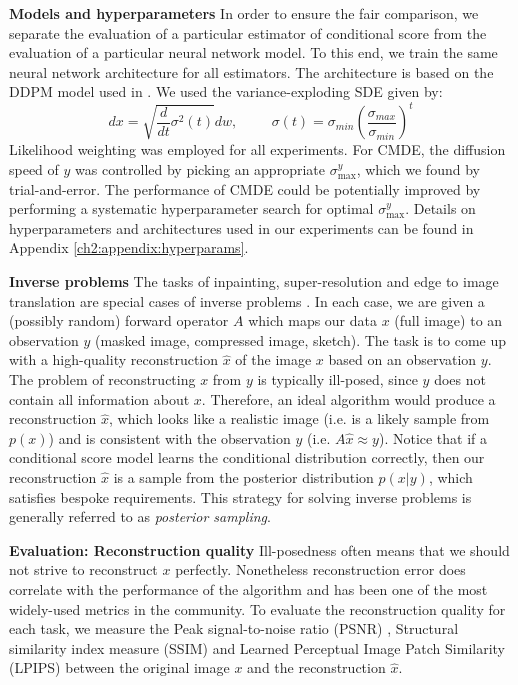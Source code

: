 \noindent
\textbf{Models and hyperparameters} In order to ensure the fair comparison, we separate the evaluation of a particular estimator of conditional score from the evaluation of a particular neural network model. To this end, we train the same neural network architecture for all estimators. The architecture is based on the DDPM model used in \cite{ho2020denoising, song2021sde}. 
We used the variance-exploding SDE \cite{song2021sde} given by: 
$$dx = \sqrt{\frac{d}{dt}\sigma^2(t)}dw, \hspace{1cm}
\sigma(t) = \sigma_{min} \left(\frac{\sigma_{max}}{\sigma_{min}}\right)^t$$
Likelihood weighting was employed for all experiments. For CMDE, the diffusion speed of $y$ was controlled by picking an appropriate $\sigma^y_{\max}$, which we found by trial-and-error. The performance of CMDE could be potentially improved by performing a systematic hyperparameter search for optimal $\sigma^y_{\max}$.
Details on hyperparameters and architectures used in our experiments can be found in Appendix \ref{ch2:appendix:hyperparams}.

\noindent 
\textbf{Inverse problems} The tasks of inpainting, super-resolution and edge to image translation are special cases of inverse problems \cite{arridge2019ip, muller2012ip}. In each case, we are given a (possibly random) forward operator $A$ which maps our data $x$ (full image) to an observation $y$ (masked image, compressed image, sketch). The task is to come up with a high-quality reconstruction $\hat{x}$ of the image $x$ based on an observation $y$. The problem of reconstructing $x$ from $y$ is typically ill-posed, since $y$ does not contain all information about $x$. Therefore, an ideal algorithm would produce a reconstruction $\hat{x}$, which looks like a realistic image (i.e. is a likely sample from $p(x)$) and is consistent with the observation $y$ (i.e. $A\hat{x} \approx y$). Notice that if a conditional score model learns the conditional distribution correctly, then our reconstruction $\hat{x}$ is a sample from the posterior distribution $p(x | y)$, which satisfies bespoke requirements. This strategy for solving inverse problems is generally referred to as \emph{posterior sampling}.

\noindent
\textbf{Evaluation: Reconstruction quality} Ill-posedness often means that we should not strive to reconstruct $x$ perfectly. Nonetheless reconstruction error does correlate with the performance of the algorithm and has been one of the most widely-used metrics in the community. To evaluate the reconstruction quality for each task, we measure the Peak signal-to-noise ratio (PSNR) \cite{zhou2004psnr+ssim}, Structural similarity index measure (SSIM) \cite{zhou2004psnr+ssim} and Learned Perceptual Image Patch Similarity (LPIPS) \cite{zhang2018lpips} between the original image $x$ and the reconstruction $\hat{x}$.

